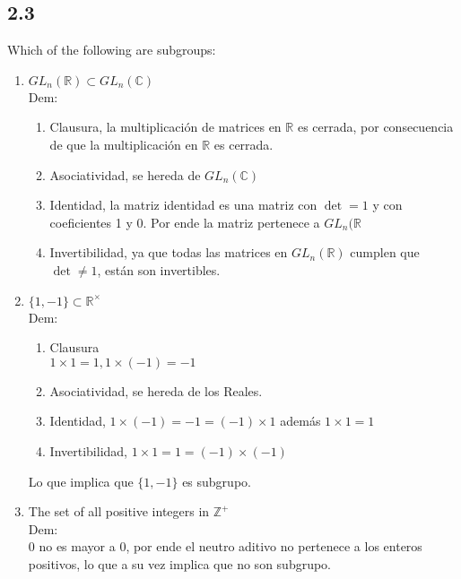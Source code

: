 \documentclass[11pt]{article}
\begin{document}
\subsection*{2.3}
Which of the following are subgroups:
\begin{enumerate}[label=(\alph*)]
	\item $GL_n(\mathbb{R})\subset GL_n(\mathbb{C})$\\
	Dem:
	\begin{enumerate}[label=\arabic*.]
		\item Clausura, la multiplicación de matrices en $\mathbb{R}$ es cerrada, por consecuencia de que la multiplicación en $\mathbb{R}$ es cerrada.
		
		\item Asociatividad, se hereda de $GL_n(\mathbb{C})$
		
		\item Identidad, la matriz identidad es una matriz con $\det =1$ y con coeficientes 1 y 0. Por ende la matriz pertenece a $GL_n(\mathbb{R}$
		
		\item Invertibilidad, ya que todas las matrices en $GL_n(\mathbb{R})$ cumplen que $\det\neq 1$, están son invertibles.
	\end{enumerate}
	
	\item $\{1,-1\}\subset\mathbb{R}^\times$\\
	Dem:
	\begin{enumerate}[label=\arabic*.]
		\item Clausura\\
		$1\times 1=1,1\times (-1)=-1$
		
		\item Asociatividad, se hereda de los Reales.
		
		\item Identidad, $1\times (-1)=-1=(-1)\times 1$ además $1\times 1=1$
		
		\item Invertibilidad, $1\times 1=1=(-1)\times (-1)$
	\end{enumerate}
	Lo que implica que $\{1,-1\}$ es subgrupo.
	
	\item The set of all positive integers in $\mathbb{Z}^+$\\
	Dem:\\
	$0$ no es mayor a $0$, por ende el neutro aditivo no pertenece a los enteros positivos, lo que a su vez implica que no son subgrupo.
	

\end{enumerate}
\end{document}
